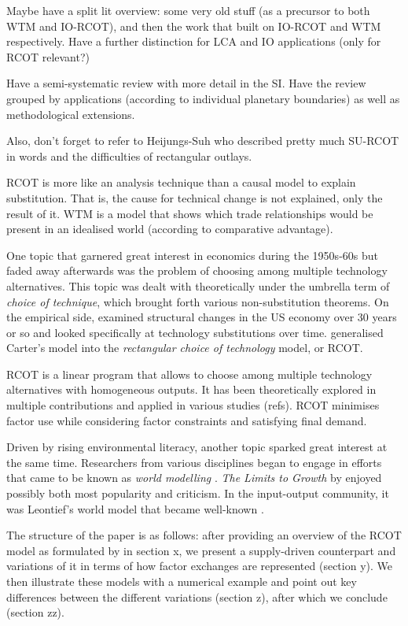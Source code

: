 Maybe have a split lit overview: some very old stuff (as a precursor to both WTM and IO-RCOT), and then the work that built on IO-RCOT and WTM respectively. Have a further distinction for LCA and IO applications (only for RCOT relevant?)

Have a semi-systematic review with more detail in the SI. Have the review grouped by applications (according to individual planetary boundaries) as well as methodological extensions.

Also, don't forget to refer to Heijungs-Suh who described pretty much SU-RCOT in words and the difficulties of rectangular outlays.

RCOT is more like an analysis technique than a causal model to explain substitution. That is, the cause for technical change is not explained, only the result of it.
WTM is a model that shows which trade relationships would be present in an idealised world (according to comparative advantage).

One topic that garnered great interest in economics during the 1950s-60s but faded away afterwards was the problem of choosing among multiple technology alternatives. This topic was dealt with theoretically under the umbrella term of \textit{choice of technique}, which brought forth various non-substitution theorems. On the empirical side, \textcite{carter1970} examined structural changes in the US economy over 30 years or so and looked specifically at technology substitutions over time. \textcite{duchin_2011} generalised Carter's model into the \textit{rectangular choice of technology} model, or RCOT.

RCOT is a linear program that allows to choose among multiple technology alternatives with homogeneous outputs. It has been theoretically explored in multiple contributions \parencite{duchin_2017,steenge_2019,duchin_2012} and applied in various studies (refs). RCOT minimises factor use while considering factor constraints and satisfying final demand.

Driven by rising environmental literacy, another topic sparked great interest at the same time. Researchers from various disciplines began to engage in efforts that came to be known as \textit{world modelling} \parencite{fontela_2004}. \textit{The Limits to Growth} by \textcite{meadows_1972} enjoyed possibly both most popularity and criticism. In the input-output community, it was Leontief's world model that became well-known \parencite{leontief_1970,leontief_1977}. 

The structure of the paper is as follows: after providing an overview of the RCOT model as formulated by \textcite{duchin_2011} in section x, we present a supply-driven counterpart and variations of it in terms of how factor exchanges are represented (section y). We then illustrate these models with a numerical example and point out key differences between the different variations (section z), after which we conclude (section zz).

